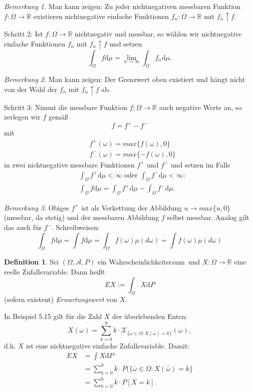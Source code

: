 \documentclass[a4paper,12pt,fleqn]{scrartcl}
\newcommand{\R}{\mathbb{R}}
\newcommand{\m}[1]{\mathcal{ #1 }}
\newcommand{\WR}{Wahrscheinlichkeitsraum}
\newcommand{\ZV}{Zufallsvariable}
\theoremstyle{definition}
\newtheorem{definition}{Definition}[section]
\theoremstyle{plain}
\theoremstyle{remark}
\newtheorem*{bemerkung}{Bemerkung}
\begin{document}
\begin{bemerkung}
Man kann zeigen: Zu jeder nichtnegativen messbaren Funktion $f: \Omega \rightarrow \R$ existieren nichtnegative einfache Funktionen $f_n: \Omega \rightarrow \R$ mit $f_n \uparrow f$.
\end{bemerkung}
Schritt 2: Ist $f: \Omega \rightarrow \R$ nichtnegativ und messbar, so wählen wir nichtnegative einfache Funktionen $f_n$ mit $f_n \uparrow f$ und setzen
\[\int_\Omega f \mathrm{d}\mu = \lim_{n \rightarrow \infty} \int_\Omega f_n \mathrm{d}\mu.\]
\begin{bemerkung}
Man kann zeigen: Der Grenzwert oben existiert und hängt nicht von der Wahl der $f_n$ mit $f_n \uparrow f$ ab.
\end{bemerkung}
Schritt 3: Nimmt die messbare Funktion $f: \Omega \rightarrow \R$ auch negative Werte an, so zerlegen wir $f$ gemäß
\[f = f^+ - f^-\]
mit
\begin{align*}
&f^+(\omega) = max\{f(\omega), 0\} \\&f^-(\omega) = max\{-f(\omega), 0\}
\end{align*}
in zwei nichtnegative messbare Funktionen $f^+$ und $f^-$ und setzen im Falle
\begin{align*}
&\int_\Omega f^+ \mathrm{d}\mu < \infty \text{ oder } \int_\Omega f^- \mathrm{d}\mu < \infty: \\
&\int_\Omega f \mathrm{d}\mu = \int_\Omega f^+ \mathrm{d}\mu - \int_\Omega f^- \mathrm{d}\mu.
\end{align*}
\begin{bemerkung}
Obiges $f^+$ ist als Verkettung der Abbildung $u \rightarrow max\{u, 0\}$ (messbar, da stetig) und der messbaren Abbildung $f$ selbst messbar. Analog gilt das auch für $f^-$. Schreibweisen:
\[\int_\Omega f \mathrm{d}\mu = \int f \mathrm{d}\mu = \int_\Omega f(\omega) \mu(d\omega) = \int f(\omega) \mu(d\omega)\]
\end{bemerkung}
\begin{definition}
Sei $(\Omega, \m{A}, P)$ ein \WR \, und $X: \Omega \rightarrow \R$ eine reelle \ZV. Dann heißt
\[EX := \int_\Omega X \mathrm{d}P\]
(sofern existent) \emph{Erwartungswert} von $X$.
\end{definition}
In Beispiel 5.15 gilt für die Zahl $X$ der überlebenden Enten:
\[X(\omega) = \sum_{k=0}^9 k \cdot \m{X}_{\{\bar{\omega} \in \Omega : X(\bar{\omega}) = k\}}(\omega),\]
d.h. $X$ ist eine nichtnegative einfache \ZV. Damit:
\begin{align*}
EX &= \int X \mathrm{d}P \\
&= \sum_{k=0}^9 k \cdot P(\{\bar{\omega} \in \Omega : X(\bar{\omega}) = k\}\\
&= \sum_{k=0}^9 k \cdot P[X=k].
\end{align*}
\end{document}

